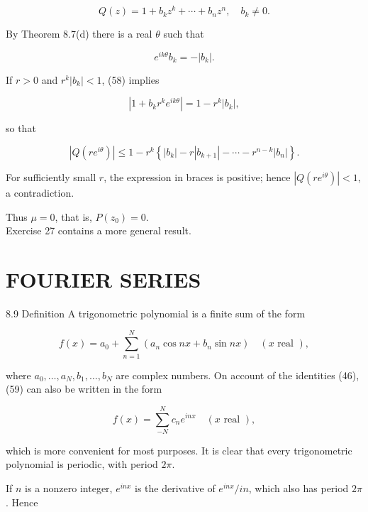 \documentclass[10pt]{article}
\begin{document}
\begin{equation*}
Q(z)=1+b_{k} z^{k}+\cdots+b_{n} z^{n}, \quad b_{k} \neq 0 . \tag{57}
\end{equation*}


By Theorem 8.7(d) there is a real $\theta$ such that


\begin{equation*}
e^{i k \theta} b_{k}=-\left|b_{k}\right| . \tag{58}
\end{equation*}


If $r>0$ and $r^{k}\left|b_{k}\right|<1$, (58) implies

$$
\left|1+b_{k} r^{k} e^{i k \theta}\right|=1-r^{k}\left|b_{k}\right|,
$$

so that

$$
\left|Q\left(r e^{i \theta}\right)\right| \leq 1-r^{k}\left\{\left|b_{k}\right|-r\left|b_{k+1}\right|-\cdots-r^{n-k}\left|b_{n}\right|\right\} .
$$

For sufficiently small $r$, the expression in braces is positive; hence $\left|Q\left(r e^{i \theta}\right)\right|<1$, a contradiction.

Thus $\mu=0$, that is, $P\left(z_{0}\right)=0$.\\
Exercise 27 contains a more general result.

\section*{FOURIER SERIES}
8.9 Definition A trigonometric polynomial is a finite sum of the form


\begin{equation*}
f(x)=a_{0}+\sum_{n=1}^{N}\left(a_{n} \cos n x+b_{n} \sin n x\right) \quad(x \text { real }), \tag{59}
\end{equation*}


where $a_{0}, \ldots, a_{N}, b_{1}, \ldots, b_{N}$ are complex numbers. On account of the identities (46), (59) can also be written in the form


\begin{equation*}
f(x)=\sum_{-N}^{N} c_{n} e^{i n x} \quad(x \text { real }), \tag{60}
\end{equation*}


which is more convenient for most purposes. It is clear that every trigonometric polynomial is periodic, with period $2 \pi$.

If $n$ is a nonzero integer, $e^{i n x}$ is the derivative of $e^{i n x} / i n$, which also has period $2 \pi$. Hence
\end{document}
